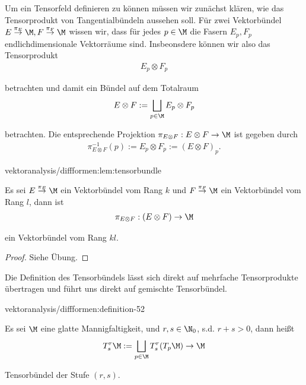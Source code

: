 \documentclass[letterpaper,10pt,english]{jupyterBook}
\begin{document}
\par
Um ein Tensorfeld definieren zu können müssen wir zunächst klären, wie das Tensorprodukt von Tangentialbündeln aussehen soll. Für zwei Vektorbündel \(E\overset{\pi_E}{\to}{\M}, F\overset{\pi_F}{\to}{\M}\) wissen wir, dass für jedes \(p\in\M\) die Fasern \(E_p, F_p\) endlichdimensionale Vektorräume sind. Insbeonsdere können wir also das Tensorprodukt
\begin{align*}
E_p\otimes F_p
\end{align*}
\par
betrachten und damit ein Bündel auf dem Totalraum
\begin{align*}
E\otimes F:= \bigsqcup_{p\in\M} E_p\otimes F_p
\end{align*}
\par
betrachten. Die entsprechende Projektion \(\pi_{E\otimes F}:E\otimes F\to\M\) ist gegeben durch
\begin{align*}
\pi_{E\otimes F}^{-1}(p):= E_p\otimes F_p := (E\otimes F)_p.
\end{align*}\begin{lemma}{}{vektoranalysis/diffformen:lem:tensorbundle}



\par
Es sei \(E\overset{\pi_E}{\to}{\M}\) ein Vektorbündel vom Rang \(k\) und \(F\overset{\pi_F}{\to}{\M}\) ein Vektorbündel vom Rang \(l\), dann ist
\begin{align*}
\pi_{E\otimes F}:(E\otimes F)\to \M
\end{align*}
\par
ein Vektorbündel vom Rang \(kl\).
\end{lemma}

\begin{proof}
 Siehe Übung.
\end{proof}

\par
Die Definition des Tensorbündels lässt sich direkt auf mehrfache Tensorprodukte übertragen und führt uns direkt auf gemischte Tensorbündel.
\begin{definition}{}{vektoranalysis/diffformen:definition-52}



\par
Es sei \(\M\) eine glatte Mannigfaltigkeit, und \(r,s\in\N_0\), s.d. \(r+s>0\), dann heißt
\begin{align*}
T^r_s\M := \bigsqcup_{p\in\M} T^r_s(T_p\M) \to \M
\end{align*}
\par
Tensorbündel der Stufe \((r,s)\).
\end{definition}
\end{document}
